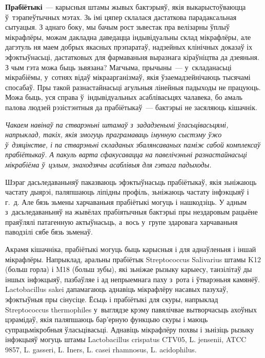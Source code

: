 \textbf{Прабіётыкі}~--- карысныя штамы жывых бактэрыяў, якія выкарыстоўваюцца ў~тэрапеўтычных мэтах. Зь імі цяпер склалася дастаткова парадаксальная сытуацыя. З аднаго боку, мы бачым рост зьвестак пра велізарны ўплыў мікрафлёры, можам дакладна даведацца індывідуальны склад мікрафлёры, але дагэтуль ня маем добрых якасных прэпаратаў, надзейных клінічных доказаў іх эфэктыўнасьці, дастатковых для фармаваньня выразнага кіраўніцтва да дзеяньня. З чым гэта можа быць зьвязана? Магчыма, прычыны~--- у~складанасьці мікрабіёмы, у~сотнях відаў мікраарганізмаў, якія ўзаемадзейнічаюць тысячамі спосабаў. Пры такой разнастайнасьці агульныя лінейныя падыходы не працуюць. Можа быць, уся справа ў~індывідуальных асаблівасьцях чалавека, бо амаль палова людзей рэзістэнтныя да прабіётыкаў~--- бактэрыі не засяляюць кішачнік.

\emph{Чакаем навінаў па стварэньні штамаў з~зададзенымі ўласьцівасьцямі, напрыклад, такіх, якія змогуць праграмаваць імунную сыстэму ўжо ў~дзяцінстве, і па стварэньні складаных збалянсаваных паміж сабой комплексаў прабіётыкаў. А пакуль варта сфакусавацца на павелічэньні разнастайнасьці мікрабіёма ў~цэлым, знаходзячы асаблівыя для гэтага падыходы.}

Шэраг дасьледаваньняў паказваюць эфэктыўнасьць прабіётыкаў, якія зьніжаюць частату дыярэі, паляпшаюць ліпідны профіль, зьніжаюць частату інфэкцыяў і г.~д. Але бязь зьмены харчаваньня прабіётыкі могуць і нашкодзіць. У адным з~дасьледаваньняў на жывёлах прабіятычныя бактэрыі пры нездаровым рацыёне праяўлялі патагенную актыўнасьць, а~вось у~групе здаровага харчаваньня паводзілі сябе бязь зьменаў. 


Акрамя кішачніка, прабіётыкі могуць быць карысныя і для аднаўленьня і іншай мікрафлёры. Напрыклад, аральны прабіётык Streptococcus Salivarius штамы K12 (больш горла) і M18 (больш зубы), які зьніжае рызыку карыесу, танзілітаў ды іншых інфэкцыяў, пазбаўляе і ад непрыемнага паху з~рота і ўтварэньня камянёў. Lactobacillus sakei дапамагаюць аднавіць мікрафлёру насавых пазухаў, эфэктыўныя пры сінусіце. Ёсьць і прабіётыкі для скуры, напрыклад Streptococcus thermophiles у~выглядзе крэму павялічвае вытворчасьць ахоўных цэрамідаў, якія паляпшаюць бар'ерную функцыю скуры і маюць супрацьмікробныя ўласьцівасьці. Аднавіць мікрафлёру похвы і зьнізіць рызыку інфэкцыяў могуць штамы Lactobacillus crispatus CTV05, L. jensenii, ATCC 9857, L. gasseri, L. Iners, L. casei rhamnosus, L. acidophilus.


